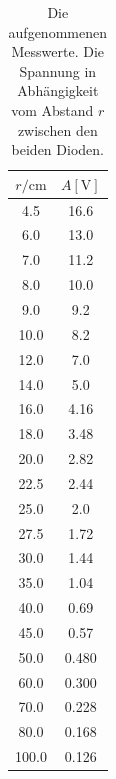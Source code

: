 \begin{table}
  \centering
  \caption{Die aufgenommenen Messwerte. Die Spannung in Abhängigkeit vom Abstand $r$ zwischen den beiden Dioden. } 
  \label{tab:data_dioden}
  \begin{tabular}{c c}
    \toprule
    $r / \si{\centi\metre}$ & $A [\si{\volt}]$\\
    \midrule
    4.5    &   16.6  \\
  6.0    &   13.0  \\
  7.0    &   11.2  \\
  8.0    &   10.0  \\
  9.0    &   9.2   \\
  10.0   &   8.2   \\
  12.0   &   7.0   \\
  14.0   &   5.0   \\
  16.0   &   4.16  \\
  18.0   &   3.48  \\
  20.0   &   2.82  \\
  22.5   &   2.44  \\
  25.0   &   2.0   \\
  27.5   &   1.72  \\
  30.0   &   1.44  \\
  35.0   &   1.04  \\
  40.0   &   0.69  \\
  45.0   &   0.57  \\
  50.0   &   0.480  \\
  60.0   &   0.300  \\
  70.0   &   0.228  \\
  80.0   &   0.168  \\
  100.0  &   0.126  \\
    \bottomrule
  \end{tabular}
\end{table}
